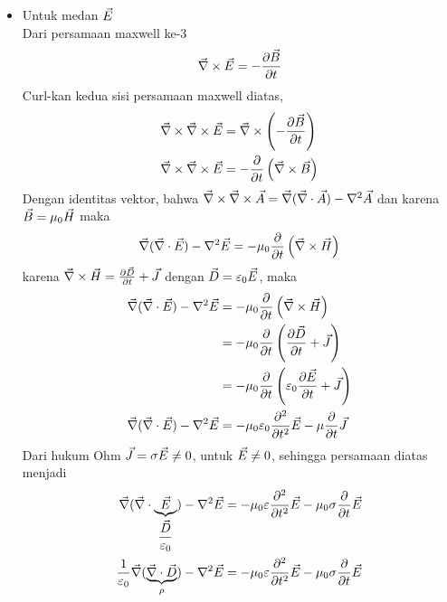 \begin{itemize}
    \item Untuk medan $\vec{E}$\\
        Dari persamaan maxwell ke-3
        \begin{equation*}
            \vec{\nabla} \times \vec{E} = -\frac{\partial \vec{B}}{\partial t}
        \end{equation*}
        Curl-kan kedua sisi persamaan maxwell diatas,
        \begin{align*}
            \vec{\nabla} \times \vec{\nabla} \times \vec{E} &= \vec{\nabla} \times \left(-\frac{\partial \vec{B}}{\partial t}\right)\\
            \vec{\nabla} \times \vec{\nabla} \times \vec{E} &=  -\frac{\partial}{\partial t}\left(\vec{\nabla} \times \vec{B} \right) 
        \end{align*}
        Dengan identitas vektor, bahwa $\vec{\nabla} \times \vec{\nabla} \times \vec{A}=\vec{\nabla}(\vec{\nabla}\cdot\vec{A})-\nabla^2 \vec{A}$ dan karena $\vec{B} = \mu_0 \vec{H}$ maka
        \begin{align*}
            \vec{\nabla}(\vec{\nabla}\cdot\vec{E})-\nabla^2\vec{E}=-\mu_0 \frac{\partial }{\partial t}\left(\vec{\nabla} \times \vec{H}\right) 
        \end{align*}
        karena $\vec{\nabla} \times \vec{H} = \frac{\partial \vec{D}}{\partial t} + \vec{J}$ dengan $\vec{D} = \varepsilon_0 \vec{E}$, maka
        \begin{align*}
            \vec{\nabla}(\vec{\nabla}\cdot\vec{E})-\nabla^2\vec{E}&=-\mu_0 \frac{\partial }{\partial t}\left(\vec{\nabla} \times \vec{H}\right)\\
            &=-\mu_0 \frac{\partial }{\partial t}\left(\frac{\partial \vec{D}}{\partial t}+\vec{J}\right) \\
            &=-\mu_0 \frac{\partial }{\partial t}\left(\varepsilon_0\frac{\partial \vec{E}}{\partial t}+\vec{J}\right) \\
            \vec{\nabla}(\vec{\nabla}\cdot\vec{E})-\nabla^2\vec{E}&=-\mu_0\varepsilon_0 \frac{\partial^2 }{\partial t^2}\vec{E}-\mu \frac{\partial }{\partial t}\vec{J}
        \end{align*}
        Dari hukum Ohm $\vec{J}=\sigma \vec{E} \neq 0$, untuk $\vec{E}\neq 0$, sehingga persamaan diatas menjadi
        \begin{align*}
            \vnabla(\vnabla\cdot\underbrace{\vec{E}}_{\dfrac{\vD}{\epsilon_0}})-\nabla^2\vE&=-\mu_0\epsilon \frac{\partial^2 }{\partial t^2}\vE-\mu_0\sigma \frac{\partial }{\partial t}\vE\\
            \frac{1}{\epsilon_0}\vnabla(\underbrace{\vnabla\cdot\vD}_{\rho})-\nabla^2\vE&=-\mu_0\epsilon \frac{\partial^2 }{\partial t^2}\vE-\mu_0\sigma \frac{\partial }{\partial t}\vE

\end{align*}
\end{itemize}
